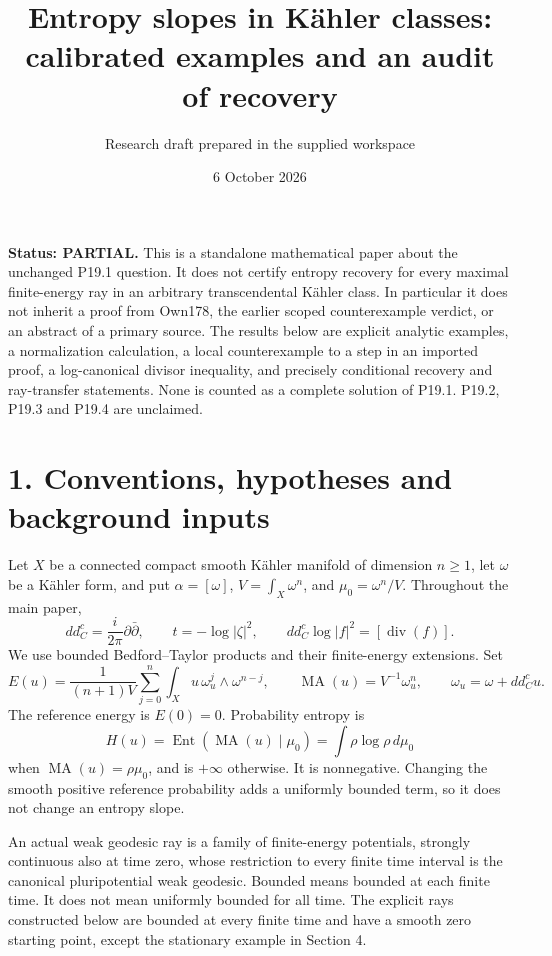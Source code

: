 \documentclass[
  11pt,
]{article}
\title{Entropy slopes in Kähler classes: calibrated examples and an
audit of recovery}
\author{Research draft prepared in the supplied workspace}
\date{6 October 2026}
\begin{document}
\maketitle

\textbf{Status: PARTIAL.} This is a standalone mathematical paper about
the unchanged P19.1 question. It does not certify entropy recovery for
every maximal finite-energy ray in an arbitrary transcendental Kähler
class. In particular it does not inherit a proof from Own178, the
earlier scoped counterexample verdict, or an abstract of a primary
source. The results below are explicit analytic examples, a
normalization calculation, a local counterexample to a step in an
imported proof, a log-canonical divisor inequality, and precisely
conditional recovery and ray-transfer statements. None is counted as a
complete solution of P19.1. P19.2, P19.3 and P19.4 are unclaimed.

\section{1. Conventions, hypotheses and background
inputs}\label{conventions-hypotheses-and-background-inputs}

Let \(X\) be a connected compact smooth Kähler manifold of dimension
\(n\geq1\), let \(\omega\) be a Kähler form, and put
\(\alpha=[\omega]\), \(V=\int_X\omega^n\), and \(\mu_0=\omega^n/V\).
Throughout the main paper, \[
 dd^c_C=\frac{i}{2\pi}\partial\bar\partial,\qquad
 t=-\log|\zeta|^2,\qquad
 dd^c_C\log|f|^2=[\operatorname{div}(f)].                 \tag{1.1}
\] We use bounded Bedford--Taylor products and their finite-energy
extensions. Set \[
 E(u)=\frac1{(n+1)V}\sum_{j=0}^n\int_Xu\,\omega_u^j\wedge\omega^{n-j},
 \qquad \operatorname{MA}(u)=V^{-1}\omega_u^n,
 \qquad \omega_u=\omega+dd^c_Cu.                         \tag{1.2}
\] The reference energy is \(E(0)=0\). Probability entropy is \[
 H(u)=\operatorname{Ent}(\operatorname{MA}(u)\mid\mu_0)
 =\int\rho\log\rho\,d\mu_0                              \tag{1.3}
\] when \(\operatorname{MA}(u)=\rho\mu_0\), and is \(+\infty\)
otherwise. It is nonnegative. Changing the smooth positive reference
probability adds a uniformly bounded term, so it does not change an
entropy slope.

An actual weak geodesic ray is a family of finite-energy potentials,
strongly continuous also at time zero, whose restriction to every finite
time interval is the canonical pluripotential weak geodesic. Bounded
means bounded at each finite time. It does not mean uniformly bounded
for all time. The explicit rays constructed below are bounded at every
finite time and have a smooth zero starting point, except the stationary
example in Section 4.
\end{document}
